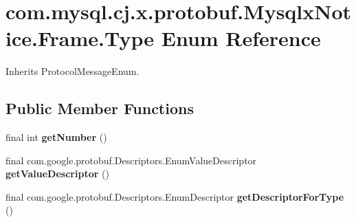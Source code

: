 \hypertarget{enumcom_1_1mysql_1_1cj_1_1x_1_1protobuf_1_1_mysqlx_notice_1_1_frame_1_1_type}{}\section{com.\+mysql.\+cj.\+x.\+protobuf.\+Mysqlx\+Notice.\+Frame.\+Type Enum Reference}
\label{enumcom_1_1mysql_1_1cj_1_1x_1_1protobuf_1_1_mysqlx_notice_1_1_frame_1_1_type}


Inherits Protocol\+Message\+Enum.

\subsection*{Public Member Functions}
\begin{DoxyCompactItemize}
\item 
\mbox{\label{enumcom_1_1mysql_1_1cj_1_1x_1_1protobuf_1_1_mysqlx_notice_1_1_frame_1_1_type_ac463d47d7382816f379b32bfb6908c71}} 
final int {\bfseries get\+Number} ()
\item 
\mbox{\label{enumcom_1_1mysql_1_1cj_1_1x_1_1protobuf_1_1_mysqlx_notice_1_1_frame_1_1_type_a2c4b503d28e32bf532df2e565c82cc53}} 
final com.\+google.\+protobuf.\+Descriptors.\+Enum\+Value\+Descriptor {\bfseries get\+Value\+Descriptor} ()
\item 
\mbox{\label{enumcom_1_1mysql_1_1cj_1_1x_1_1protobuf_1_1_mysqlx_notice_1_1_frame_1_1_type_af070c7d9804c4ba17740f896756fd654}} 
final com.\+google.\+protobuf.\+Descriptors.\+Enum\+Descriptor {\bfseries get\+Descriptor\+For\+Type} ()
\end{DoxyCompactItemize}
